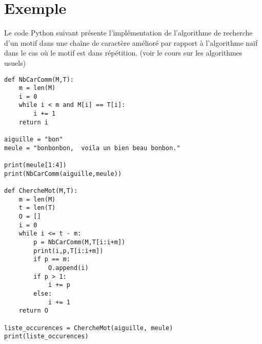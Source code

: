 \section{Exemple}
Le code Python suivant présente l'implémentation de l'algorithme de recherche d'un motif dans une chaîne de caractère amélioré par rapport à l'algorithme naïf dans le cas où le motif est dans répétition. (voir le cours sur les algorithmes usuels)
\begin{verbatim}
def NbCarComm(M,T):
    m = len(M)
    i = 0
    while i < m and M[i] == T[i]:
        i += 1
    return i
    
aiguille = "bon"
meule = "bonbonbon,  voila un bien beau bonbon."

print(meule[1:4])
print(NbCarComm(aiguille,meule))

def ChercheMot(M,T):
    m = len(M)
    t = len(T)
    O = []
    i = 0
    while i <= t - m:
        p = NbCarComm(M,T[i:i+m])
        print(i,p,T[i:i+m])
        if p == m:
            O.append(i)
        if p > 1:
            i += p
        else:
            i += 1
    return O
    
liste_occurences = ChercheMot(aiguille, meule)
print(liste_occurences)
\end{verbatim}


